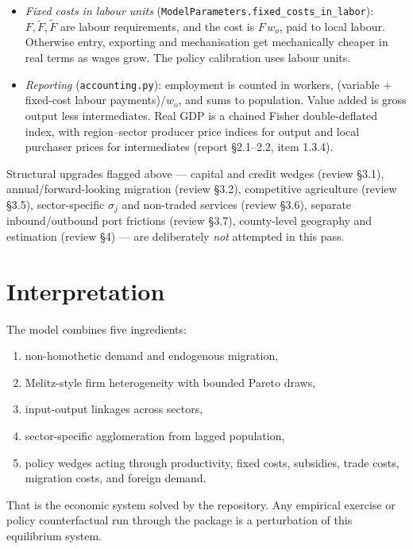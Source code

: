 \documentclass[11pt]{article}
\begin{document}
\begin{itemize}[leftmargin=1.5em]
      (incomes too low for the Engel shifters) are truncated and renormalised. This guards
      transient solver iterates only, and \texttt{checks.pigl\_share\_violation} verifies that
      it does not bind at a solved path.
\item \emph{Fixed costs in labour units} (\texttt{ModelParameters.fixed\_costs\_in\_labor}):
      $F,\breve F,\tilde F$ are labour requirements, and the cost is $F\,w_o$, paid to local
      labour. Otherwise entry, exporting and mechanisation get mechanically cheaper in real
      terms as wages grow. The policy calibration uses labour units.
\item \emph{Reporting} (\texttt{accounting.py}): employment is counted in workers,
      (variable $+$ fixed-cost labour payments)$/w_o$, and sums to population. Value added is
      gross output less intermediates. Real GDP is a chained Fisher double-deflated index, with
      region--sector producer price indices for output and local purchaser prices for
      intermediates (report \S2.1--2.2, item 1.3.4).
\end{itemize}

Structural upgrades flagged above --- capital and credit wedges (review \S3.1),
annual/forward-looking migration (review \S3.2), competitive agriculture (review \S3.5),
sector-specific $\sigma_j$ and non-traded services (review \S3.6), separate
inbound/outbound port frictions (review \S3.7), county-level geography and estimation
(review \S4) --- are deliberately \emph{not} attempted in this pass.

\section{Interpretation}
The model combines five ingredients:
\begin{enumerate}[leftmargin=1.5em]
\item non-homothetic demand and endogenous migration,
\item Melitz-style firm heterogeneity with bounded Pareto draws,
\item input-output linkages across sectors,
\item sector-specific agglomeration from lagged population,
\item policy wedges acting through productivity, fixed costs, subsidies, trade costs,
      migration costs, and foreign demand.
\end{enumerate}

That is the economic system solved by the repository. Any empirical exercise or policy
counterfactual run through the package is a perturbation of this equilibrium system.
\end{document}
